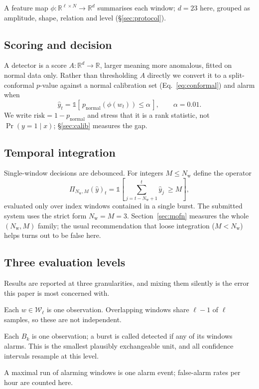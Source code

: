 \documentclass{article}
\begin{document}
A feature map $\phi:\mathbb{R}^{\ell\times N}\!\to\mathbb{R}^{d}$ summarises
each window; $d=23$ here, grouped as amplitude, shape, relation and level
(\S\ref{sec:protocol}).

\subsection{Scoring and decision}

A detector is a score $A:\mathbb{R}^{d}\!\to\mathbb{R}$, larger meaning more
anomalous, fitted on normal data only. Rather than thresholding $A$ directly we
convert it to a split-conformal $p$-value against a normal calibration set
(Eq.~\ref{eq:conformal}) and alarm when
\begin{equation}
\hat y_t=\mathbb{1}\!\left[\,p_{\mathrm{normal}}(\phi(w_t))\le\alpha\,\right],
\qquad \alpha=0.01 .
\label{eq:decide}
\end{equation}
We write $\mathrm{risk}=1-p_{\mathrm{normal}}$ and stress that it is a rank
statistic, not $\Pr(y=1\mid x)$; \S\ref{sec:calib} measures the gap.

\subsection{Temporal integration}

Single-window decisions are debounced. For integers $M\le N_{\mathrm w}$ define
the operator
\begin{equation}
\Pi_{N_{\mathrm w},M}(\hat y)_t=\mathbb{1}\!\left[\textstyle\sum_{j=t-N_{\mathrm w}+1}^{t}\hat y_j\ \ge M\right],
\label{eq:mofn}
\end{equation}
evaluated only over index windows contained in a single burst. The submitted
system uses the strict form $N_{\mathrm w}=M=3$. Section~\ref{sec:mofn}
measures the whole $(N_{\mathrm w},M)$ family; the usual recommendation that
loose integration ($M<N_{\mathrm w}$) helps turns out to be false here.

\subsection{Three evaluation levels}
\label{sub:levels}

Results are reported at three granularities, and mixing them silently is the
error this paper is most concerned with.

\begin{description}\itemsep2pt
\item[$\mathcal{L}_1$ window.] Each $w\in\mathcal{W}_\ell$ is one observation.
  Overlapping windows share $\ell-1$ of $\ell$ samples, so these are not
  independent.
\item[$\mathcal{L}_2$ burst.] Each $B_k$ is one observation; a burst is called
  detected if any of its windows alarms. This is the smallest plausibly
  exchangeable unit, and all confidence intervals resample at this level.
\item[$\mathcal{L}_3$ event.] A maximal run of alarming windows is one alarm
  event; false-alarm rates per hour are counted here.
\end{description}
\end{document}
